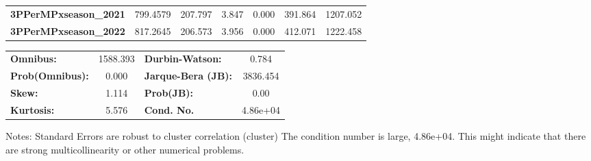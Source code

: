 \begin{center}
\begin{tabular}{lcccccc}
\textbf{3PPerMPxseason\_2021} &     799.4579  &      207.797     &     3.847  &         0.000        &      391.864    &     1207.052     \\
\textbf{3PPerMPxseason\_2022} &     817.2645  &      206.573     &     3.956  &         0.000        &      412.071    &     1222.458     \\
\bottomrule
\end{tabular}
\begin{tabular}{lclc}
\textbf{Omnibus:}       & 1588.393 & \textbf{  Durbin-Watson:     } &    0.784  \\
\textbf{Prob(Omnibus):} &   0.000  & \textbf{  Jarque-Bera (JB):  } & 3836.454  \\
\textbf{Skew:}          &   1.114  & \textbf{  Prob(JB):          } &     0.00  \\
\textbf{Kurtosis:}      &   5.576  & \textbf{  Cond. No.          } & 4.86e+04  \\
\bottomrule
\end{tabular}
\end{center}

Notes: \newline
 [1] Standard Errors are robust to cluster correlation (cluster) \newline
 [2] The condition number is large, 4.86e+04. This might indicate that there are \newline
 strong multicollinearity or other numerical problems.